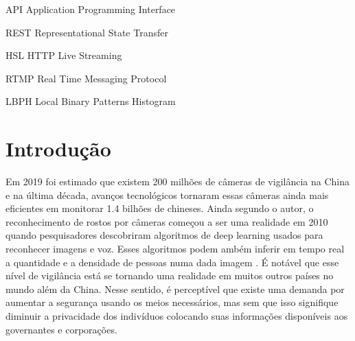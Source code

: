 \documentclass[12pt, %
openright, 
oneside, %
a4paper,    %
brazil]{facom-ufu-abntex2}
\begin{document}
\begin{siglas} %
	\item[API] Application Programming Interface
	\item[REST] Representational State Transfer
	\item[HSL] HTTP Live Streaming
	\item[RTMP] Real Time Messaging Protocol
	\item[LBPH] Local Binary Patterns Histogram
\end{siglas}


\tableofcontents*
\cleardoublepage

\textual


\chapter[Introdução]{Introdução}
Em 2019 foi estimado que existem 200 milhões de câmeras de vigilância na China
e na última década, avanços tecnológicos tornaram essas câmeras ainda mais
eficientes em monitorar 1.4 bilhões de chineses. Ainda segundo o autor, o
reconhecimento de rostos por câmeras começou a ser uma realidade em 2010 quando
pesquisadores descobriram algoritmos de deep learning usados para reconhecer
imagens e voz. Esses algoritmos podem ambém inferir em tempo real a quantidade
e a densidade de pessoas numa dada imagem \cite{qiang2019road}. É notável que
esse nível de vigilância está se tornando uma realidade em muitos outros países
no mundo além da China. Nesse sentido, é perceptível que existe uma demanda por
aumentar a segurança usando os meios necessários, mas sem que isso signifique
diminuir a privacidade dos indivíduos colocando suas informações disponíveis
aos governantes e corporações.
\end{document}
